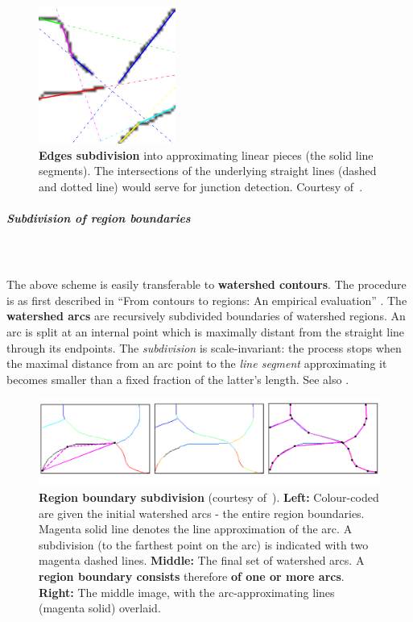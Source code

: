 \begin{figure}[ht!]
 \centering
 \includegraphics[width=0.4\textwidth,frame]{images/gPb-OWT-UCM/Maire2008using-contour-subdivision.png}
 \caption[Edges subdivision - an image patch]{{\bf Edges subdivision} into approximating linear pieces (the solid line segments). The intersections of the underlying straight lines (dashed and dotted line) would serve for junction detection. Courtesy of~\cite{Maire2008using}.}
 \label{fig:Maire08using-contour-subdivision}
\end{figure}

\subparagraph{Subdivision of region boundaries}\mbox{}\\\mbox{}\\
The above scheme is easily transferable to {\bf watershed contours}. The procedure is as first described in ``From contours to regions: An empirical evaluation'' \cite{Arbelaez09}. The {\bf watershed arcs} are recursively subdivided boundaries of watershed regions. An arc is split at an internal point which is maximally distant from the straight line through %
its endpoints. The {\it subdivision} is scale-invariant: the process stops when the maximal distance from an arc point to the {\it line segment} approximating it becomes smaller than a fixed fraction of the latter's %
length. See also .

\begin{figure}[ht!]
 \centering
 \includegraphics[width=1\textwidth]{images/gPb-OWT-UCM/Arbelaez11-contour-subdivision.png}
 \caption[Region boundary subdivision]{{\bf Region boundary subdivision} (courtesy of~\cite{Arbelaez11}). {\bf Left:} Colour-coded are given the initial watershed arcs - the entire  %
 region boundaries. Magenta solid line denotes the line approximation of the arc. A subdivision (to the farthest point on the arc) is indicated with two magenta dashed lines. {\bf Middle:} The final set of watershed arcs. A {\bf region boundary consists} therefore {\bf of one or more arcs}. {\bf Right:} The middle image, with the arc-approximating lines (magenta solid) overlaid.}
 \label{fig:Arbelaez11-contour-subdivision}
\end{figure}

